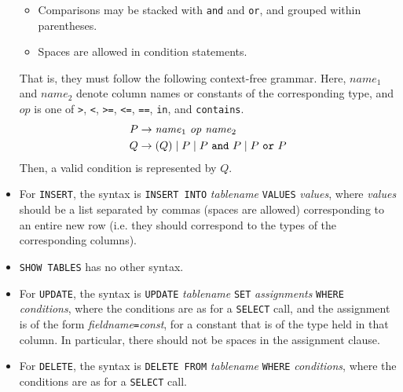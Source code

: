 \documentclass[10pt]{article}
\begin{document}
\begin{multicols}{2}
\begin{itemize}
\begin{itemize}
		\item Comparisons may be stacked with \verb+and+ and \verb+or+, and grouped within parentheses.
		\item Spaces are allowed in condition statements.
	\end{itemize}
	That is, they must follow the following context-free grammar. Here, $\mathit{name}_1$ and $\mathit{name}_2$ denote column names or constants of the corresponding type, and $\mathit{op}$ is one of \verb+>+, \verb+<+, \verb+>=+, \verb+<=+, \verb+==+, \verb+in+, and \verb+contains+.
	\begin{align*}
		P &\to \mathit{name}_1\ \mathit{op}\ \mathit{name}_2\\
		Q &\to (Q) \mid P \mid P\text{ \texttt{and} } P\mid P\text{ \texttt{or} } P
	\end{align*}
	Then, a valid condition is represented by $Q$.
	\item For \texttt{INSERT}, the syntax is \texttt{INSERT INTO} \textit{tablename} \texttt{VALUES} \textit{values}, where \textit{values} should be a list separated by commas (spaces are allowed) corresponding to an entire new row (i.e. they should correspond to the types of the corresponding columns).
	\item \texttt{SHOW TABLES} has no other syntax.
	\item For \texttt{UPDATE}, the syntax is \texttt{UPDATE} \textit{tablename} \texttt{SET} \textit{assignments} \texttt{WHERE} \textit{conditions}, where the conditions are as for a \verb+SELECT+ call, and the assignment is of the form \textit{fieldname}\verb+=+\textit{const}, for a constant that is of the type held in that column. In particular, there should not be spaces in the assignment clause.
	\item For \texttt{DELETE}, the syntax is \texttt{DELETE FROM} \textit{tablename} \texttt{WHERE} \textit{conditions}, where the conditions are as for a \verb+SELECT+ call.
\end{itemize}

\end{multicols}
\end{document}

